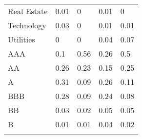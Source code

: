\begin{table}[]
\begin{tabular}{lllll}
Real Estate & \cellcolor[HTML]{FBFCFE}0.01 & \cellcolor[HTML]{FCFCFF}0 & \cellcolor[HTML]{FBFCFE}0.01 & \cellcolor[HTML]{FCFCFF}0 \\
Technology & \cellcolor[HTML]{F8FBFC}0.03 & \cellcolor[HTML]{FCFCFF}0 & \cellcolor[HTML]{FBFCFE}0.01 & \cellcolor[HTML]{FBFCFE}0.01 \\
Utilities & \cellcolor[HTML]{FCFCFF}0 & \cellcolor[HTML]{FCFCFF}0 & \cellcolor[HTML]{F6FAFA}0.04 & \cellcolor[HTML]{F2F8F6}0.07 \\
AAA & \cellcolor[HTML]{EDF6F2}0.1 & \cellcolor[HTML]{A7DAB6}0.56 & \cellcolor[HTML]{D5ECDD}0.26 & \cellcolor[HTML]{B0DDBD}0.5 \\
AA & \cellcolor[HTML]{D5ECDD}0.26 & \cellcolor[HTML]{D9EEE1}0.23 & \cellcolor[HTML]{E6F3EC}0.15 & \cellcolor[HTML]{D6EDDE}0.25 \\
A & \cellcolor[HTML]{CDE9D7}0.31 & \cellcolor[HTML]{EFF7F4}0.09 & \cellcolor[HTML]{D5ECDD}0.26 & \cellcolor[HTML]{ECF6F1}0.11 \\
BBB & \cellcolor[HTML]{D2EBDB}0.28 & \cellcolor[HTML]{EFF7F4}0.09 & \cellcolor[HTML]{D8EEE0}0.24 & \cellcolor[HTML]{F0F8F5}0.08 \\
BB & \cellcolor[HTML]{F8FBFC}0.03 & \cellcolor[HTML]{F9FBFD}0.02 & \cellcolor[HTML]{F5F9F9}0.05 & \cellcolor[HTML]{F5F9F9}0.05 \\
B & \cellcolor[HTML]{FBFCFE}0.01 & \cellcolor[HTML]{FBFCFE}0.01 & \cellcolor[HTML]{F6FAFA}0.04 & \cellcolor[HTML]{F9FBFD}0.02 \\
\hline \\[-1.8ex] 
\end{tabular}
\end{table}

